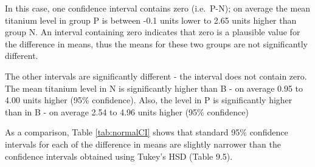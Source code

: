 \documentclass[
  oneside]{krantz}
\begin{document}
In this case, one confidence interval contains zero (i.e.~P-N); on average the mean titanium level in group P is between -0.1 units lower to 2.65 units higher than group N. An interval containing zero indicates that zero is a plausible value for the difference in means, thus the means for these two groups are not significantly different.

The other intervals are significantly different - the interval does not contain zero. The mean titanium level in N is significantly higher than B - on average 0.95 to 4.00 units higher (95\% confidence). Also, the level in P is significantly higher than in B - on average 2.54 to 4.96 units higher (95\% confidence)

As a comparison, Table \ref{tab:normalCI} shows that standard 95\% confidence intervals for each of the difference in means are slightly narrower than the confidence intervals obtained using Tukey's HSD (Table 9.5).
\end{document}
